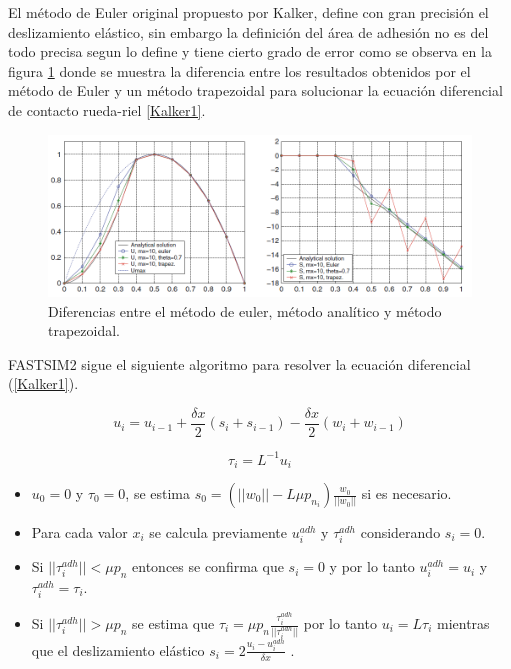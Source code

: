 \documentclass[main]{subfiles}
\begin{document}
El método de Euler original propuesto por Kalker, define con gran precisión el deslizamiento elástico, sin embargo la definición del área de adhesión no es del todo precisa segun lo define \citet{2011CompM..47..105V} y tiene cierto grado de error como se observa en la figura \ref{fig:KalkervsFastsim2} donde se muestra la diferencia entre los resultados obtenidos por el método de Euler y un método trapezoidal para solucionar la ecuación diferencial de contacto rueda-riel \ref{Kalker1}.

\begin{figure}[!htbp]
\centering
    \includegraphics[scale=0.55]{Kalker1.png}
  \caption{Diferencias entre el método de euler, método analítico y método trapezoidal.}
  \label{fig:KalkervsFastsim2}
\end{figure}  

\pagebreak 

FASTSIM2 sigue el siguiente algoritmo para resolver la ecuación diferencial (\ref{Kalker1}).


\begin{equation}
\label{FastSim21}
u_i=u_{i-1}+\frac{\delta x}{2}(s_i+s_{i-1})-\frac{\delta x}{2}(w_i+w_{i-1})
\end{equation}

\begin{equation}
\label{FastSim22}
\tau_i=L^{-1}u_i
\end{equation}

\par \hspace{1cm}
\begin{minipage}{10cm}
\begin{spacing}{0.5}
\begin{itemize}
\item $u_0=0$ y $\tau_0=0$, se estima $s_0=(||w_0||-L\mu p_{n_{i}})\frac{w_0}{||w_0||}$ si es necesario.
\item Para cada valor $x_i$ se calcula previamente $u_i^{adh}$ y $\tau_i^{adh}$  considerando $s_i=0$.
\item Si $||\tau_i^{adh}||<\mu p_n$ entonces se confirma que $s_i=0$ y por lo tanto $u_i^{adh}=u_i$ y $\tau_i^{adh}=\tau_i$.
\item Si $||\tau_i^{adh}||>\mu p_n$ se estima que 
$\tau_i=\mu p_n \frac{\tau_i^{adh}}{||\tau_i^{adh}||}$ por lo tanto $u_i=L \tau_i$ mientras que el deslizamiento elástico $s_i=2\frac{u_i-u_i^{adh}}{\delta x}$ .
\end{itemize}
\end{spacing}
\end{minipage}
\end{document}
